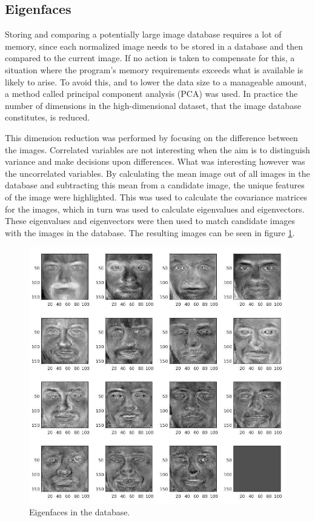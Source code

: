 \subsection{Eigenfaces}
Storing and comparing a potentially large image database requires a lot of
memory, since each normalized image needs to be stored in a database and then
compared to the current image. If no action is taken to compensate for this, a
situation where the program’s memory requirements exceeds what is available is
likely to arise. To avoid this, and to lower the data size to a manageable
amount, a method called principal component analysis (PCA) was used. In
practice the number of dimensions in the high-dimensional dataset, that the
image database constitutes, is reduced. \cite{eigface}

This dimension reduction was performed by focusing on the difference between
the images. Correlated variables are not interesting when the aim is to
distinguish variance and make decisions upon differences. What was interesting
however was the uncorrelated variables. By calculating the mean image out of
all images in the database and subtracting this mean from a candidate image,
the unique features of the image were highlighted. This was used to calculate
the covariance matrices for the images, which in turn was used to calculate
eigenvalues and eigenvectors. These eigenvalues and eigenvectors were then
used to match candidate images with the images in the database. The resulting images can be seen in figure \ref{fig:eigen}.

\begin{figure}[htbp]
  \centering
  \includegraphics[width=\columnwidth]{images/eigen.jpg}
  \caption{Eigenfaces in the database.}
  \label{fig:eigen}
\end{figure}

